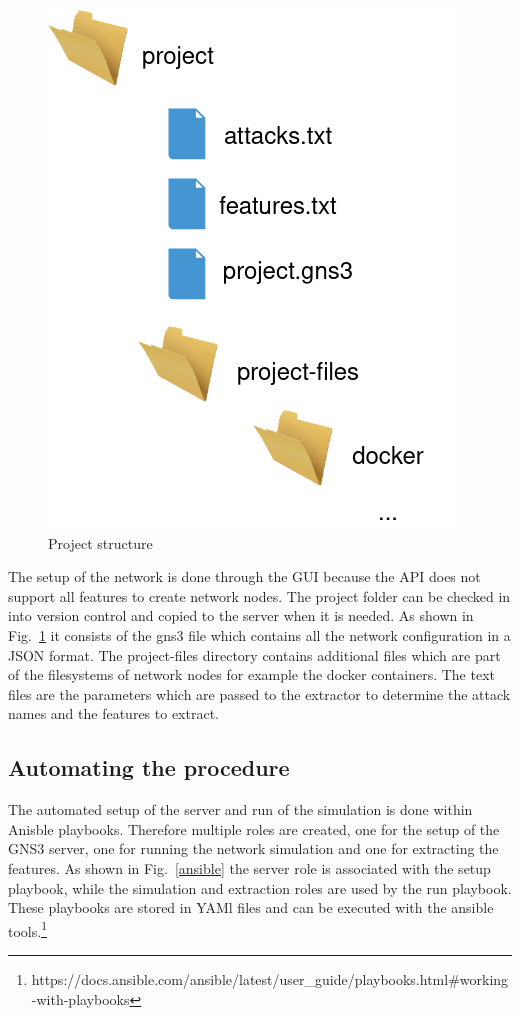 \documentclass[conference]{IEEEtran}
\begin{document}
\begin{figure}[htbp]
\centerline{\includegraphics[scale=0.33]{project.png}}
\caption{Project structure}
\label{project}
\end{figure}

The setup of the network is done through the GUI because the API does not support all features to create network nodes. The project folder can be checked in into version control and copied to the server when it is needed. As shown in Fig.~\ref{project} it consists of the gns3 file which contains all the network configuration in a JSON format. The project-files directory contains additional files which are part of the filesystems of network nodes for example the docker containers. The text files are the parameters which are passed to the extractor to determine the attack names and the features to extract.

\subsection{Automating the procedure}

The automated setup of the server and run of the simulation is done within Anisble playbooks. Therefore multiple roles are created, one for the setup of the GNS3 server, one for running the network simulation and one for extracting the features. As shown in Fig.~\ref{ansible} the server role is associated with the setup playbook, while the simulation and extraction roles are used by the run playbook. These playbooks are stored in YAMl files and can be executed with the ansible tools.\footnote{https://docs.ansible.com/ansible/latest/user\_guide/playbooks.html\#working-with-playbooks}  
\end{document}
